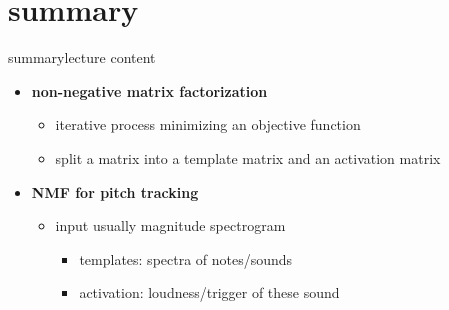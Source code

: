     \section{summary}
        \begin{frame}{summary}{lecture content}
            \begin{itemize}
                \item   \textbf{non-negative matrix factorization}
                    \begin{itemize}
                        \item   iterative process minimizing an objective function
                        \item   split a matrix into a template matrix and an activation matrix
                    \end{itemize}
                \bigskip
                \item   \textbf{NMF for pitch tracking}
                    \begin{itemize}
                        \item   input usually magnitude spectrogram
                            \begin{itemize}
                                \item   templates: spectra of notes/sounds
                                \item   activation: loudness/trigger of these sound
                            \end{itemize}
                    \end{itemize}
            \end{itemize}
        \end{frame}

